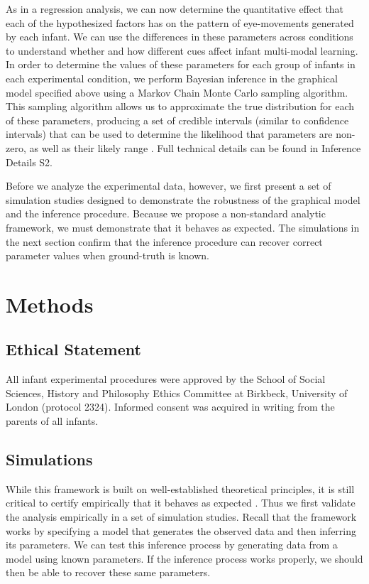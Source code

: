\documentclass[12pt]{article}
\begin{document}
	As in a regression analysis, we can now determine the quantitative effect that each of the hypothesized factors has on the pattern of eye-movements generated by each infant. We can use the differences in these parameters across conditions to understand whether and how different cues affect infant multi-modal learning. In order to determine the values of these parameters for each group of infants in each experimental condition, we perform Bayesian inference in the graphical model specified above using a Markov Chain Monte Carlo sampling algorithm. This sampling algorithm allows us to approximate the true distribution for each of these parameters, producing a set of credible intervals (similar to confidence intervals) that can be used to determine the likelihood that parameters are non-zero, as well as their likely range \cite{Edwards1963, Kruschke2011}. Full technical details can be found in Inference Details S2.

	Before we analyze the experimental data, however, we first present a set of simulation studies designed to demonstrate the robustness of the graphical model and the inference procedure. Because we propose a non-standard analytic framework, we must demonstrate that it behaves as expected. The simulations in the next section confirm that the inference procedure can recover correct parameter values when ground-truth is known.

\section*{Methods}

\subsection*{Ethical Statement}

All infant experimental procedures were approved by the School of Social Sciences, History and Philosophy Ethics Committee at Birkbeck, University of London (protocol 2324). Informed consent was acquired in writing from the parents of all infants.

\subsection*{Simulations}
	While this framework is built on well-established theoretical principles, it is still critical to certify empirically that it behaves as expected \cite{Glymour1998}. Thus we first validate the analysis empirically in a set of simulation studies. Recall that the framework works by specifying a model that generates the observed data and then inferring its parameters. We can test this inference process by generating data from a model using known parameters. If the inference process works properly, we should then be able to recover these same parameters. 
\end{document}
